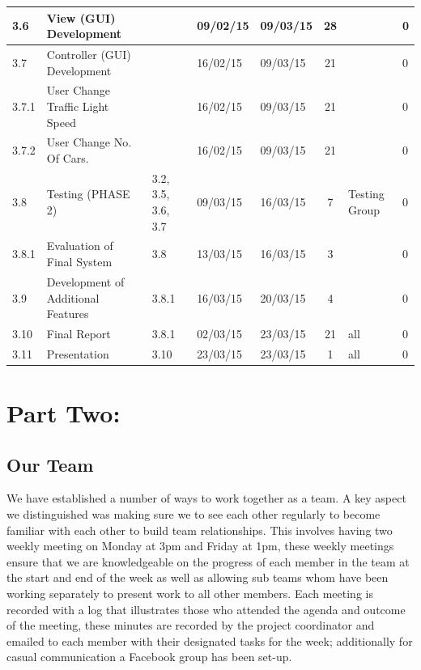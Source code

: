 \documentclass[a4paper,11pt]{article}
\begin{document}
\begin{table}[ht]
\begin{adjustwidth}{-2cm}{}
\begin{tabular}{|m{0.8cm}|m{6cm}|m{2.3cm}|m{1.3cm}|m{1.3cm}|c|m{2.6cm}|m{0.5cm}|}
			3.6 & View (GUI) Development &  & 09/02/15 & 09/03/15 & 28 &  & 0 \\\hline 
			3.7 & Controller (GUI) Development  &  & 16/02/15 & 09/03/15 & 21 &  & 0 \\\hline 
			3.7.1 & User Change Traffic Light Speed  &  & 16/02/15 & 09/03/15 & 21 &  & 0 \\\hline 
			3.7.2 & User Change No. Of Cars.  &  & 16/02/15 & 09/03/15 & 21 &  & 0 \\\hline 
			3.8 & Testing (PHASE 2)  & 3.2, 3.5, 3.6, 3.7 & 09/03/15 & 16/03/15 & 7 & Testing Group & 0 \\\hline 
			3.8.1 & Evaluation of Final System  & 3.8 & 13/03/15 & 16/03/15 & 3 &  & 0 \\\hline 
			3.9 & Development of Additional Features & 3.8.1 & 16/03/15 & 20/03/15 & 4 &  & 0 \\\hline 
			3.10 & Final Report & 3.8.1 & 02/03/15 & 23/03/15 & 21 & all & 0 \\\hline 
			3.11 & Presentation & 3.10 & 23/03/15 & 23/03/15 & 1 & all & 0 \\ \hline 
		\end{tabular}
	\label{table:plan}
	\end{adjustwidth}
\end{table}

\section[short]{Part Two:}
\subsection{Our Team}%
We have established a number of ways to work together as a team. A key aspect we distinguished was making sure we to see each other regularly to become familiar with each other to build team relationships. This involves having two weekly meeting on Monday at 3pm and Friday at 1pm, these weekly meetings ensure that we are knowledgeable on the progress of each member in the team at the start and end of the week as well as allowing sub teams whom have been working separately to present work to all other members. Each meeting is recorded with a log that illustrates those who attended the agenda and outcome of the meeting, these minutes are recorded by the project coordinator and emailed to each member with their designated tasks for the week; additionally for casual communication a Facebook group has been set-up.
\end{document}
